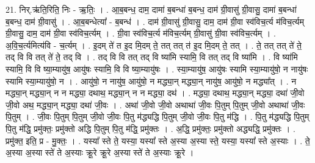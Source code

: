 \documentclass[17pt]{extarticle}
\begin{document}
21. निर्.ऋ॑ति॒रिति॒ निः - ऋ॒तिः॒ । . आ॒ब॒बन्ध॒ दाम॒ दामा॑ ब॒बन्धा॑ ब॒बन्ध॒ दाम॑ ग्री॒वासु॑ ग्री॒वासु॒ दामा॑ ब॒बन्धा॑ ब॒बन्ध॒ दाम॑ ग्री॒वासु॑ । . आ॒ब॒बन्धेत्या᳚ - ब॒बन्ध॑ । . दाम॑ ग्री॒वासु॑ ग्री॒वासु॒ दाम॒ दाम॑ ग्री॒वा स्व॑विच॒र्त्य म॑विच॒र्त्यम् ग्री॒वासु॒ दाम॒ दाम॑ ग्री॒वा स्व॑विच॒र्त्यम् । . ग्री॒वा स्व॑विच॒र्त्य म॑विच॒र्त्यम् ग्री॒वासु॑ ग्री॒वा स्व॑विच॒र्त्यम् । . अ॒वि॒च॒र्त्यमित्य॑वि - च॒र्त्यम् । . इ॒दम् ते॑ त इ॒द मि॒दम् ते॒ तत् तत् त॑ इ॒द मि॒दम् ते॒ तत् । . ते॒ तत् तत् ते॑ ते॒ तद् वि वि तत् ते॑ ते॒ तद् वि । . तद् वि वि तत् तद् वि ष्या॑मि स्यामि॒ वि तत् तद् वि ष्या॑मि । . वि ष्या॑मि स्यामि॒ वि वि ष्या॒म्यायु॑ष॒ आयु॑षः स्यामि॒ वि वि ष्या॒म्यायु॑षः । . स्या॒म्यायु॑ष॒ आयु॑षः स्यामि स्या॒म्यायु॑षो॒ न नायु॑षः स्यामि स्या॒म्यायु॑षो॒ न । . आयु॑षो॒ न नायु॑ष॒ आयु॑षो॒ न मद्ध्या॒न् मद्ध्या॒न् नायु॑ष॒ आयु॑षो॒ न मद्ध्या᳚त् । . न मद्ध्या॒न् मद्ध्या॒न् न न मद्ध्या॒ दथाथ॒ मद्ध्या॒न् न न मद्ध्या॒ दथ॑ । . मद्ध्या॒ दथाथ॒ मद्ध्या॒न् मद्ध्या॒ दथा॑ जी॒वो जी॒वो अथ॒ मद्ध्या॒न् मद्ध्या॒ दथा॑ जी॒वः । . अथा॑ जी॒वो जी॒वो अथाथा॑ जी॒वः पि॒तुम् पि॒तुम् जी॒वो अथाथा॑ जी॒वः पि॒तुम् । . जी॒वः पि॒तुम् पि॒तुम् जी॒वो जी॒वः पि॒तु म॑द्ध्यद्धि पि॒तुम् जी॒वो जी॒वः पि॒तु म॑द्धि । . पि॒तु म॑द्ध्यद्धि पि॒तुम् पि॒तु म॑द्धि॒ प्रमु॑क्तः॒ प्रमु॑क्तो अद्धि पि॒तुम् पि॒तु म॑द्धि॒ प्रमु॑क्तः । . अ॒द्धि॒ प्रमु॑क्तः॒ प्रमु॑क्तो अद्ध्यद्धि॒ प्रमु॑क्तः । . प्रमु॑क्त॒ इति॒ प्र - मु॒क्तः॒ । . यस्या᳚ स्ते ते॒ यस्या॒ यस्या᳚ स्ते अ॒स्या अ॒स्या स्ते॒ यस्या॒ यस्या᳚ स्ते अ॒स्याः । . ते॒ अ॒स्या अ॒स्या स्ते॑ ते अ॒स्याः क्रू॒रे क्रू॒रे अ॒स्या स्ते॑ ते अ॒स्याः क्रू॒रे । \newline
\end{document}
